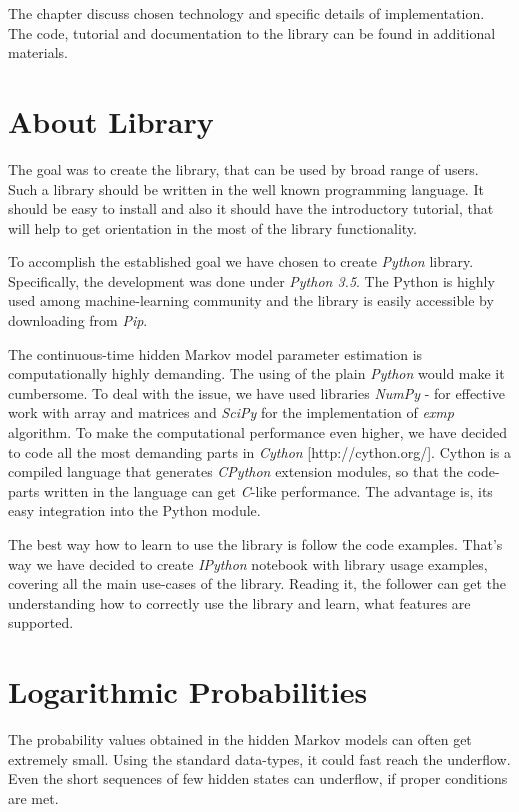 \documentclass[thesis=M,english]{FITthesis}[2012/10/20]
\begin{document}
The chapter discuss chosen technology and specific details of implementation. 
The code, tutorial and documentation to the library can be found in additional materials.

\section{About Library}

The goal was to create the library, that can be used by broad range of users. Such a library should be written in the well known programming language. It should be easy to install and also it should have the introductory tutorial, that will help to get orientation in the most of the library functionality. 

To accomplish the established goal we have chosen to create \textit{Python} library. Specifically, the development was done under \textit{Python 3.5}. The Python is highly used among machine-learning community and the library is easily accessible by downloading from \textit{Pip}. %

The continuous-time hidden Markov model parameter estimation is computationally highly demanding. The using of the plain \textit{Python} would make it cumbersome. To deal with the issue, we have used libraries \textit{NumPy} - for effective work with array and matrices and \textit{SciPy} \cite{Sc01} for the implementation of \textit{exmp} algorithm. To make the computational performance even higher, we have decided to code all the most demanding parts in \textit{Cython} [http://cython.org/]. Cython is a compiled language that generates \textit{CPython} extension modules, so that the code-parts written in the language can get \textit{C}-like performance. The advantage is, its easy integration into the Python module.

The best way how to learn to use the library is follow the code examples. That's way we have decided to create \textit{IPython} notebook with library usage examples, covering all the main use-cases of the library. Reading it, the follower can get the understanding how to correctly use the library and learn, what features are supported.          


\section{Logarithmic Probabilities}

The probability values obtained in the hidden Markov models can often get extremely small. Using the standard data-types, it could fast reach the underflow. Even the short sequences of few hidden states can underflow, if proper conditions are met. 
\end{document}
